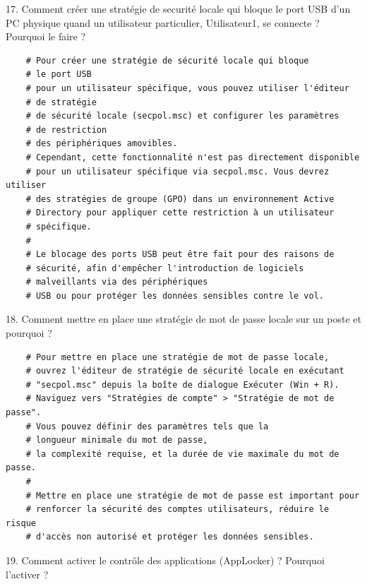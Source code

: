 \vspace{0.5cm}

17. Comment créer une stratégie de securité locale qui bloque le port USB d'un PC physique quand un utilisateur particulier, Utilisateur1, se connecte ? Pourquoi le faire ?

\begin{center}
  \begin{verbatim}
    # Pour créer une stratégie de sécurité locale qui bloque
    # le port USB
    # pour un utilisateur spécifique, vous pouvez utiliser l'éditeur
    # de stratégie
    # de sécurité locale (secpol.msc) et configurer les paramètres
    # de restriction
    # des périphériques amovibles.
    # Cependant, cette fonctionnalité n'est pas directement disponible
    # pour un utilisateur spécifique via secpol.msc. Vous devrez utiliser
    # des stratégies de groupe (GPO) dans un environnement Active
    # Directory pour appliquer cette restriction à un utilisateur
    # spécifique.
    #
    # Le blocage des ports USB peut être fait pour des raisons de
    # sécurité, afin d'empêcher l'introduction de logiciels
    # malveillants via des périphériques
    # USB ou pour protéger les données sensibles contre le vol.
  \end{verbatim}
\end{center}

18. Comment mettre en place une stratégie de mot de passe locale sur un poste et pourquoi ?

\begin{center}
  \begin{verbatim}
    # Pour mettre en place une stratégie de mot de passe locale,
    # ouvrez l'éditeur de stratégie de sécurité locale en exécutant
    # "secpol.msc" depuis la boîte de dialogue Exécuter (Win + R).
    # Naviguez vers "Stratégies de compte" > "Stratégie de mot de passe".
    # Vous pouvez définir des paramètres tels que la
    # longueur minimale du mot de passe,
    # la complexité requise, et la durée de vie maximale du mot de passe.
    #
    # Mettre en place une stratégie de mot de passe est important pour
    # renforcer la sécurité des comptes utilisateurs, réduire le risque
    # d'accès non autorisé et protéger les données sensibles.
  \end{verbatim}
\end{center}

\vspace{0.5cm}

19. Comment activer le contrôle des applications (AppLocker) ? Pourquoi l'activer ?

